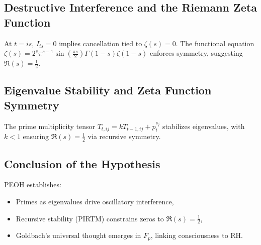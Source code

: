 \documentclass{article}
\begin{document}
\subsection{Destructive Interference and the Riemann Zeta Function}
At \( t = i s \), \( I_{is} = 0 \) implies cancellation tied to \( \zeta(s) = 0 \). The functional equation \( \zeta(s) = 2^s \pi^{s-1} \sin\left(\frac{\pi s}{2}\right) \Gamma(1-s) \zeta(1-s) \) enforces symmetry, suggesting \( \Re(s) = \frac{1}{2} \).

\subsection{Eigenvalue Stability and Zeta Function Symmetry}
The prime multiplicity tensor \( T_{t,ij} = k T_{t-1,ij} + p_i^{s_j} \) stabilizes eigenvalues, with \( k < 1 \) ensuring \( \Re(s) = \frac{1}{2} \) via recursive symmetry.

\subsection{Conclusion of the Hypothesis}
PEOH establishes:
\begin{itemize}
    \item Primes as eigenvalues drive oscillatory interference,
    \item Recursive stability (PIRTM) constrains zeros to \( \Re(s) = \frac{1}{2} \),
    \item Goldbach’s universal thought emerges in \( F_p \), linking consciousness to RH.
\end{itemize}
\nocite{*}


\end{document}
